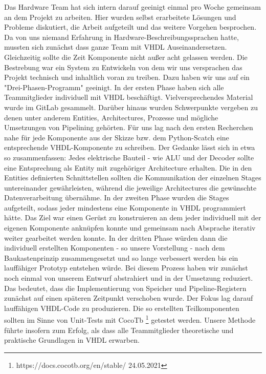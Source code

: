 \documentclass[paper=a4,fontsize=12pt,twocolumn]{scrreprt}
\begin{document}
Das Hardware Team hat sich intern darauf geeinigt einmal pro Woche gemeinsam an dem Projekt zu arbeiten. 
Hier wurden selbst erarbeitete Lösungen und Probleme diskutiert, die Arbeit aufgeteilt und das weitere Vorgehen besprochen.
Da von uns niemand Erfahrung in Hardware-Beschreibungssprachen hatte, mussten sich zunächst dass ganze Team mit VHDL Auseinandersetzen.
Gleichzeitig sollte die Zeit Komponente nicht außer acht gelassen werden.
Die Bestrebung war ein System zu Entwickeln von dem wir uns versprachen das Projekt technisch und inhaltlich voran zu treiben.
Dazu haben wir uns auf ein "Drei-Phasen-Programm" geeinigt. In der ersten Phase haben sich alle Teammitglieder individuell mit VHDL beschäftigt.
Vielversprechendes Material wurde im GitLab gesammelt.
Darüber hinaus wurden Schwerpunkte vergeben zu denen unter anderem Entities, Architectures, Prozesse und mögliche Umsetzungen von Pipelining gehörten.
Für uns lag nach den ersten Recherchen nahe für jede Komponente aus der Skizze bzw. dem Python-Scatch eine entsprechende VHDL-Komponente zu schreiben.
Der Gedanke lässt sich in etwa so zusammenfassen: Jedes elektrische Bauteil - wie ALU und der Decoder sollte eine Entsprechung als Entity mit zugehöriger Architecture erhalten.
Die in den Entities definierten Schnittstellen sollten die Kommunikation der einzelnen Stages untereinander gewährleisten, während die jeweilige Architectures die gewünschte Datenverarbeitung übernähme.
In der zweiten Phase wurden die Stages aufgeteilt, sodass jeder mindestens eine Komponente in VHDL programmiert hätte.
Das Ziel war einen Gerüst zu konstruieren an dem jeder individuell mit der eigenen Komponente anknüpfen konnte und gemeinsam nach Absprache iterativ weiter gearbeitet werden konnte.
In der dritten Phase würden dann die individuell erstellten Komponenten - so unsere Vorstellung - nach dem Baukastenprinzip zusammengesetzt und so lange verbessert werden bis ein lauffähiger Prototyp entstehen würde.
Bei diesem Prozess haben wir zunächst noch einmal von unserem Entwurf abstrahiert und in der Umsetzung reduziert.
Das bedeutet, dass die Implementierung von Speicher und Pipeline-Registern zunächst auf einen späteren Zeitpunkt verschoben wurde.
Der Fokus lag darauf lauffähigen VHDL-Code zu produzieren.
Die so erstellten Teilkomponenten sollten im Sinne von Unit-Tests mit CocoTb \footnote{https://docs.cocotb.org/en/stable/ 24.05.2021} getestet werden.
Unsere Methode führte insofern zum Erfolg, als dass alle Teammitglieder theoretische und praktische Grundlagen in VHDL erwarben.
\end{document}
